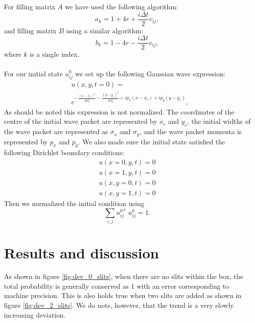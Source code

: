 \documentclass[english,notitlepage,reprint,nofootinbib]{revtex4-1}  %
\begin{document}
	For filling matrix $A$ we have used the following algorithm:
	\begin{equation}
		a_k = 1 + 4r + \frac{i \Delta t}{2} v_{ij},
	\end{equation}
	and filling matrix $B$ using a similar algorithm: 
	\begin{equation}
		b_k = 1 - 4r - \frac{i \Delta t}{2} v_{ij},
	\end{equation}
	where $k$ is a single index.
	\\
	\\
	
	For our initial state $u^0_{ij}$ we set up the following Gaussian wave expression:
	\begin{equation}
		\begin{split}
			&u(x,y,t=0) = \\ &e^{-\frac{(x-x_c)^2}{2 \sigma_x^2} - \frac{(y-y_c)^2}{2 \sigma_y^2} + i p_x (x-x_c) + i p_y (y-y_c)},
		\end{split}
	\end{equation}
	As should be noted this expression is not normalized. The coordinates of the centre of the initial wave packet are represented by $x_c$ and $y_c$, the initial widths of the wave packet are represented as $\sigma_x$ and $\sigma_y$, and the wave packet momenta is represented by $p_x$ and $p_y$. We also made sure the initial state satisfied the following Dirichlet boundary conditions:
	\begin{align*}
		u(x=0,y,t) = 0 \\
		u(x=1,y,t) = 0 \\
		u(x,y=0,t) = 0 \\
		u(x,y=1,t) = 0 
	\end{align*}
	Then we normalized the initial condition using
	\begin{equation}
		\sum\limits_{i,j} u^{0*}_{ij} \, u^0_{ij} = 1.
	\end{equation}
	
	\section{Results and discussion}\label{sec:results}
	
	As shown in figure \ref{fig:dev_0_slits}, when there are no slits within the box, the total probability is generally conserved as 1 with an error corresponding to machine precision.
	This is also holds true when two slits are added as shown in figure \ref{fig:dev_2_slits}. We do note, however, that the trend is a very slowly increasing deviation.
	
\end{document}
